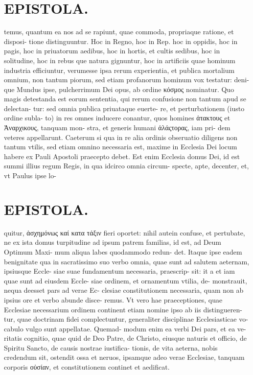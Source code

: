 \documentclass{article}
\begin{document}
\begin{pages}
\section*{EPISTOLA. }\pstart temus, quantum ea nos ad se rapiunt, quae commoda, propriaque ratione, et disposi- tione distinguuntur. Hoc in Regno, hoc in Rep. hoc in oppidis, hoc in pagis, hoc in priuatorum aedibus, hoc in hortis, et cultis sedibus, hoc in solitudine, hoc in rebus que natura gignuntur, hoc in artificiis quae hominum industria efficiuntur, verumesse ipsa rerum experientia, et publica mortalium omnium, non tantum piorum, sed etiam profanorum hominum vox testatur: deni- que Mundus ipse, pulcherrimum Dei opus, ab ordine κόσμος nominatur. Quo magis detestanda est eorum sententia, qui rerum confusione non tantum apud se delectan- tur: sed omnia publica priuataque euerte- re, et perturbationem (iusto ordine subla- to) in res omnes inducere conantur, quos homines ἀτακτους et Ἀναρχικους, tanquam mon- stra, et generis humani ἀλάςτορας, iam pri- dem veteres appellarunt. Caeterum si qua in re alia ordinis obseruatio diligens non tantum vtilis, sed etiam omnino necessaria est, maxime in Ecclesia Dei locum habere ex Pauli Apostoli praecepto debet. Est enim Ecclesia domus Dei, id est summi illius regum Regis, in qua idcirco omnia circum- specte, apte, decenter, et, vt Paulus ipse lo-  \pend
\section*{EPISTOLA. }\pstart quitur, ἀσχημόνως καί κατα τάξιν fieri oportet: nihil autein confuse, et pertubate, ne ex ista domus turpitudine ad ipsum patrem familias, id est, ad Deum Optimum Maxi- mum aliqua labes quodammodo redun- det. Itaque ipse eadem benignitate qua in sacratissimo suo verbo omnia, quae sunt ad salutem aeternam, ipsiusque Eccle- siae suae fundamentum necessaria, praescrip- sit: it a et iam quae sunt ad eiusdem Eccle- siae ordinem, et ornamentum vtilia, de- monstrauit, nequa deesset pars ad verae Ec- clesiae constitutionem necessaria, quam non ab ipsius ore et verbo abunde disce- remus. Vt vero hae praeceptiones, quae Ecclesiae necessarium ordinem continent etiam nomine ipso ab iis distingueren- tur, quae doctrinam fidei complectuntur, generaliter disciplinae Ecclesiasticae vo- cabulo vulgo sunt appellatae. Quemad- modum enim ea verbi Dei pars, et ea ve- ritatis cognitio, quae quid de Deo Patre, de Christo, eiusque naturis et officio, de Spiritu Sancto, de causis nostrae iustifica- tionis, de vita aeterna, nobis credendum sit, ostendit ossa et neruos, ipsamque adeo verae Ecclesiae, tanquam corporis οὐσίαν, et constitutionem continet et aedificat.  \pend

\end{pages}
\end{document}
